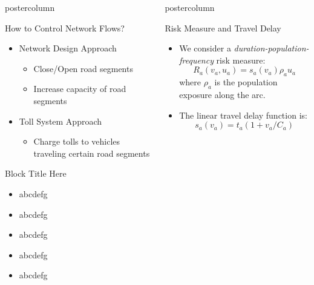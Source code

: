 \documentclass[final]{beamer}
\def\red{\color{red}}
\newlength{\columnheight}
\begin{document}
\begin{frame}
\begin{columns}
\begin{column}{0.32\textwidth}
\begin{beamercolorbox}[center,wd=\textwidth]{postercolumn}
\begin{minipage}[T]{.95\textwidth}
{  \begin{block}{How to Control Network Flows?}
    \begin{itemize}
    \item Network Design Approach
    	\begin{itemize}
    	\item Close/Open road segments
    	\item Increase capacity of road segments
    	\end{itemize}
    \item Toll System Approach
    	\begin{itemize}
    	\item Charge tolls to vehicles traveling certain road segments
    	\end{itemize}
    \end{itemize}
  \end{block}


  \begin{block}{Block Title Here}
  	\begin{itemize}
  	\item abcdefg
  	\item abcdefg
  	\item abcdefg
  	\item abcdefg
  	\item abcdefg
  	\end{itemize}
  \end{block}
  


}
\end{minipage}
\end{beamercolorbox}
\end{column}
\begin{column}{0.32\textwidth}
\begin{beamercolorbox}[center,wd=\textwidth]{postercolumn}
\begin{minipage}[T]{.95\textwidth}
\parbox[t][\columnheight]{\textwidth}{


  \begin{block}{Risk Measure and Travel Delay}
    \begin{itemize}
    \item We consider a \emph{\red duration-population-frequency} risk measure:
    \[
    R_a(v_a,u_a) = s_a(v_a) \rho_a u_a
    \]
    where $\rho_a$ is the population exposure along the arc.
    \item The linear travel delay function is:
    \[
    s_a(v_a) = t_a \left( 1 + v_a / C_a \right)
    \]
    \end{itemize}
  \end{block}



}
\end{minipage}
\end{beamercolorbox}
\end{column}
\end{columns}
\end{frame}
\end{document}
